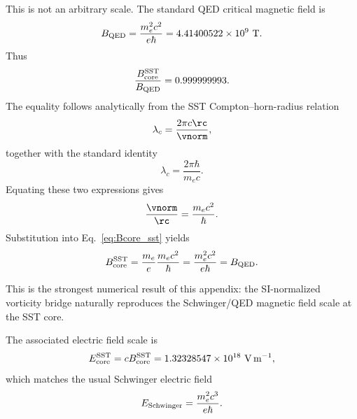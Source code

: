     This is not an arbitrary scale.  The standard QED critical magnetic field
    is
    \begin{equation}
        B_{\rm QED}
        =
        \frac{m_e^2c^2}{e\hbar}
        =
        4.41400522\times10^{9}\ {\rm T}.
        \label{eq:Bqed}
    \end{equation}
    Thus
    \begin{equation}
        \frac{B_{\rm core}^{\rm SST}}{B_{\rm QED}}
        =
        0.999999993.
        \label{eq:Bcore_Bqed_ratio}
    \end{equation}
    The equality follows analytically from the SST Compton--horn-radius relation
    \begin{equation}
        \lambda_c
        =
        \frac{2\pi c\rc}{\vnorm},
        \label{eq:compton_core_relation}
    \end{equation}
    together with the standard identity
    \begin{equation}
        \lambda_c
        =
        \frac{2\pi\hbar}{m_ec}.
    \end{equation}
    Equating these two expressions gives
    \begin{equation}
        \frac{\vnorm}{\rc}
        =
        \frac{m_ec^2}{\hbar}.
        \label{eq:omega_core_compton}
    \end{equation}
    Substitution into Eq.~\eqref{eq:Bcore_sst} yields
    \begin{equation}
        B_{\rm core}^{\rm SST}
        =
        \frac{m_e}{e}
        \frac{m_ec^2}{\hbar}
        =
        \frac{m_e^2c^2}{e\hbar}
        =
        B_{\rm QED}.
        \label{eq:Bcore_equals_Bqed}
    \end{equation}
    
    This is the strongest numerical result of this appendix: the SI-normalized
    vorticity bridge naturally reproduces the Schwinger/QED magnetic field
    scale at the SST core.
    
    The associated electric field scale is
    \begin{equation}
        E_{\rm core}^{\rm SST}
        =
        cB_{\rm core}^{\rm SST}
        =
        1.32328547\times10^{18}\ {\rm V\,m^{-1}},
        \label{eq:Ecore_numeric}
    \end{equation}
    which matches the usual Schwinger electric field
    \begin{equation}
        E_{\rm Schwinger}
        =
        \frac{m_e^2c^3}{e\hbar}.
        \label{eq:Schwinger_field}
    \end{equation}

